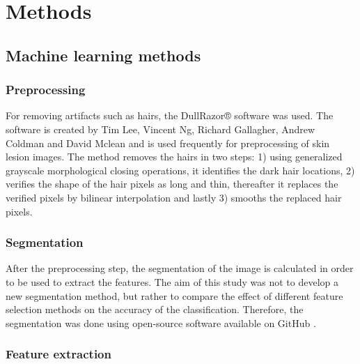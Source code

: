 \documentclass{kththesis}
\begin{document}

\chapter{Methods}

\section{Machine learning methods}

\subsection{Preprocessing}

For removing artifacts such as hairs, the DullRazor® software was used. The software is created by Tim Lee, Vincent Ng, Richard Gallagher, Andrew Coldman and David Mclean and is used frequently for preprocessing of skin lesion images. The method removes the hairs in two steps: 1) using generalized grayscale morphological closing operations, it identifies the dark hair locations, 2) verifies the shape of the hair pixels as long and thin, thereafter it replaces the verified pixels by bilinear interpolation and lastly 3) smooths the replaced hair pixels. \parencite{dermwebDullRazor} %


\subsection{Segmentation}


After the preprocessing step, the segmentation of the image is calculated in order to be used to extract the features.
The aim of this study was not to develop a new segmentation method, but rather to compare the effect of different feature selection methods on the accuracy of the classification. Therefore, the segmentation was done using open-source software available on GitHub \parencite{melanoma-classifier}. 

\subsection{Feature extraction}
\end{document}
